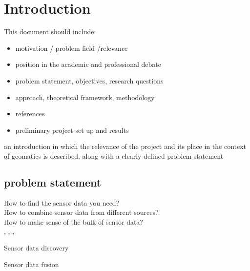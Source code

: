 
\chapter{Introduction}
\label{chap:introduction}

This document should include:

\begin{itemize} 
\item motivation / problem field /relevance

\item position in the academic and professional debate

\item problem statement, objectives, research questions

\item approach, theoretical framework, methodology

\item references

\item preliminary project set up and results

\end{itemize}


an introduction in which the relevance of the project and its place in the context of geomatics is described, along with a clearly-defined problem statement\\


\section{problem statement}
How to find the sensor data you need?\\
How to combine sensor data from different sources?\\
How to make sense of the bulk of sensor data?\\

\cite{SSW:Wang}, \cite{SSW:Corcho}, \cite{SSW:Ji}, \cite{SSW:Huang}


Sensor data discovery \cite{SSW:Llaves}

Sensor data fusion \cite{SSW:Perera}


